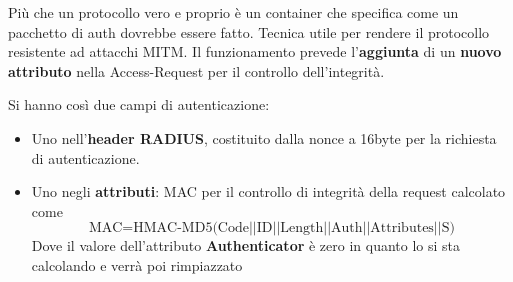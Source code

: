 \begin{theorem}
Più che un protocollo vero e proprio è un container che specifica come un pacchetto di auth dovrebbe essere fatto. 
Tecnica utile per rendere il protocollo resistente ad attacchi MITM. Il funzionamento prevede l'\textbf{aggiunta} di un \textbf{nuovo attributo} nella Access-Request per il controllo dell'integrità.
\end{theorem}\pagebreak
Si hanno così due campi di autenticazione:
\begin{itemize}
    \item Uno nell'\textbf{header RADIUS}, costituito dalla nonce a 16byte per la richiesta di autenticazione.
    \item Uno negli \textbf{attributi}: MAC per il controllo di integrità della request calcolato come
    \[\text{MAC}=\text{HMAC-MD5(Code||ID||Length||Auth||Attributes||S)}\]
    Dove il valore dell'attributo \textbf{Authenticator} è zero in quanto lo si sta calcolando e verrà poi rimpiazzato
\end{itemize}
